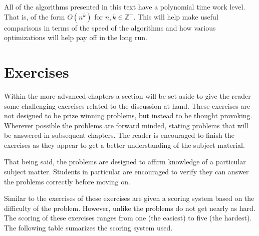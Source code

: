 \documentclass[b5paper]{book}
\def\Z{{\mathbb Z}}
\begin{document}
All of the algorithms presented in this text have a polynomial time work level.  That is, of the form 
$O(n^k)$ for $n, k \in \Z^{+}$.  This will help make useful comparisons in terms of the speed of the algorithms and how 
various optimizations will help pay off in the long run.

\section{Exercises}
Within the more advanced chapters a section will be set aside to give the reader some challenging exercises related to
the discussion at hand.  These exercises are not designed to be prize winning problems, but instead to be thought 
provoking.  Wherever possible the problems are forward minded, stating problems that will be answered in subsequent 
chapters.  The reader is encouraged to finish the exercises as they appear to get a better understanding of the 
subject material.  

That being said, the problems are designed to affirm knowledge of a particular subject matter.  Students in particular
are encouraged to verify they can answer the problems correctly before moving on.

Similar to the exercises of \cite[pp. ix]{TAOCPV2} these exercises are given a scoring system based on the difficulty of
the problem.  However, unlike \cite{TAOCPV2} the problems do not get nearly as hard.  The scoring of these 
exercises ranges from one (the easiest) to five (the hardest).  The following table sumarizes the 
scoring system used.
\end{document}
